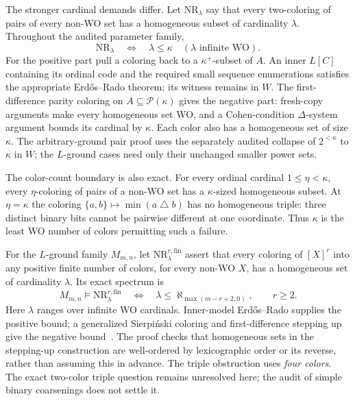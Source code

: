 The stronger cardinal demands differ. Let $\mathrm{NR}_\lambda$ say
that every two-coloring of pairs of every non-WO set has a homogeneous
subset of cardinality $\lambda$. Throughout the audited parameter family,
\[
                 \mathrm{NR}_\lambda
                          \quad\Longleftrightarrow\quad\lambda\leq\kappa
                 \quad(\lambda\text{ infinite WO}).            \tag{15}
\]
For the positive part pull a coloring back to a $\kappa^+$-subset of
$A$. An inner $L[C]$ containing its ordinal code and the required small
sequence enumerations satisfies the appropriate Erd\H{o}s--Rado theorem;
its witness remains in $W$. The first-difference parity coloring on
$A\subseteq\mathcal P(\kappa)$ gives the negative part: fresh-copy
arguments make every homogeneous set WO, and a Cohen-condition
$\Delta$-system argument bounds its cardinal by $\kappa$. Each color
also has a homogeneous set of size $\kappa$. The arbitrary-ground pair
proof uses the separately audited collapse of $2^{<\kappa}$ to $\kappa$
in $W$; the $L$-ground cases need only their unchanged smaller power sets.

The color-count boundary is also exact. For every ordinal cardinal
$1\leq\eta<\kappa$, every $\eta$-coloring of pairs of a non-WO set has a
$\kappa$-sized homogeneous subset. At $\eta=\kappa$ the coloring
$\{a,b\}\mapsto\min(a\mathbin\triangle b)$ has no homogeneous triple:
three distinct binary bits cannot be pairwise different at one coordinate.
Thus $\kappa$ is the least WO number of colors permitting such a failure.

For the $L$-ground family $M_{m,n}$, let
$\mathrm{NR}^{r,\mathrm{fin}}_\lambda$ assert that every coloring of
$[X]^r$ into any positive finite number of colors, for every non-WO $X$,
has a homogeneous set of cardinality $\lambda$. Its exact spectrum is
\[
 M_{m,n}\models\mathrm{NR}^{r,\mathrm{fin}}_\lambda
 \quad\Longleftrightarrow\quad
 \lambda\leq\aleph_{\max(m-r+2,0)},\qquad r\geq2.             \tag{16}
\]
Here $\lambda$ ranges over infinite WO cardinals. Inner-model Erd\H{o}s--Rado
supplies the positive bound; a generalized Sierpi\'nski coloring and
first-difference stepping up give the negative bound~\cite{ErdosRado,BHT}.
The proof checks that homogeneous sets in the stepping-up construction
are well-ordered by lexicographic order or its reverse, rather than
assuming this in advance. The triple obstruction uses \emph{four colors}.
The exact two-color triple question remains unresolved here; the audit
of simple binary coarsenings does not settle it.

